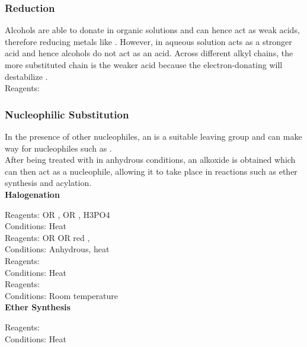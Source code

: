 \documentclass[../main]{subfiles}
\begin{document}
	\subsubsection{Reduction}

	Alcohols are able to donate  in organic solutions and can hence act as weak acids, therefore reducing metals like . However, in aqueous solution  acts as a stronger acid and hence alcohols do not act as an acid. Across different alkyl chains, the more substituted chain is the weaker acid because the electron-donating  will destabilize . \\

	Reagents:  \\


	\subsubsection{Nucleophilic Substitution}

	In the presence of other nucleophiles, an  is a suitable leaving group and can make way for nucleophiles such as . \\

	After being treated with  in anhydrous conditions, an alkoxide  is obtained which can then act as a nucleophile, allowing it to take place in reactions such as ether synthesis and acylation. \\

	\noindent \textbf{Halogenation}

	Reagents:  OR ,  OR , {H3PO4} \\
	Conditions:  Heat \\

	Reagents:  OR  OR red ,  \\
	Conditions:  Anhydrous, heat \\

	Reagents:  \\
	Conditions:  Heat \\

	Reagents:  \\
	Conditions:  Room temperature \\

	\noindent \textbf{Ether Synthesis}

	Reagents:  \\
	Conditions:  Heat \\
\end{document}
